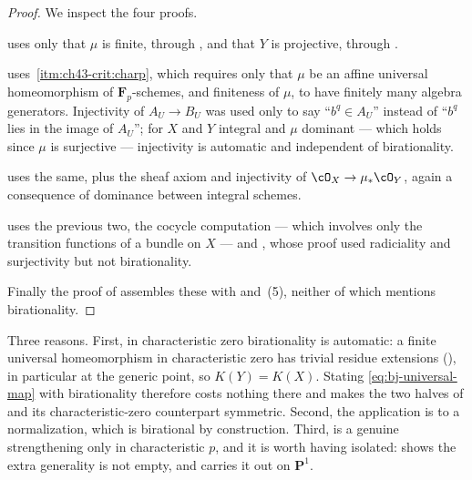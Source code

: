 \begin{proof}
We inspect the four proofs.

 uses only that $\mu$ is finite,
through , and that $Y$ is projective,
through .

 uses
\,\cref{itm:ch43-crit:charp}, which requires only
that $\mu$ be an affine universal homeomorphism of
$\mathbf F_p$-schemes, and finiteness of $\mu$, to have finitely many
algebra generators.  Injectivity of $A_U\to B_U$ was used only to say
``$b^q\in A_U$'' instead of ``$b^q$ lies in the image of $A_U$''; for
$X$ and $Y$ integral and $\mu$ dominant --- which holds since $\mu$
is surjective --- injectivity is automatic and independent of
birationality.

 uses the same, plus the sheaf axiom
and injectivity of $\cO_X\to\mu_*\cO_Y$, again a consequence of dominance
between integral schemes.

 uses the previous two, the cocycle
computation --- which involves only the transition functions of a bundle on
$X$ --- and , whose proof
used radiciality and surjectivity but not birationality.

Finally the proof of  assembles
these with  and
\,(5), neither of which mentions
birationality.
\end{proof}

\begin{remark}
\label{rem:ch43-birational-still-stated}
Three reasons.  First, in characteristic zero birationality is automatic: a
finite universal homeomorphism in characteristic zero has trivial residue
extensions (), in particular at the
generic point, so $K(Y)=K(X)$.  Stating \eqref{eq:bj-universal-map} with
birationality therefore costs nothing there and makes the two halves of
 and its characteristic-zero
counterpart symmetric.  Second, the application is to a normalization, which
is birational by construction.  Third,
 is a genuine strengthening only in
characteristic $p$, and it is worth having isolated:
 shows the extra generality is not empty, and
 carries it out on $\mathbf P^1$.
\end{remark}

